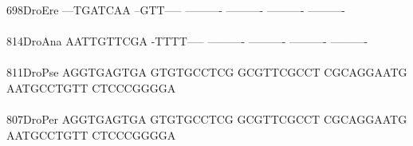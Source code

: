 \documentclass[11pt,twoside,reqno,a4paper]{article}
\begin{document}
{698\hspace*{2\charwidth}DroEre	---TGATCAA	--GTT-----	----------	----------	----------	----------	\\
\hspace*{5\charwidth}\hspace*{7\charwidth}\hspace*{1\charwidth}\hspace*{1\charwidth}\hspace*{1\charwidth}\hspace*{1\charwidth}\hspace*{1\charwidth}\hspace*{1\charwidth}\\
814\hspace*{2\charwidth}DroAna	AATTGTTCGA	-TTTT-----	----------	----------	----------	----------	\\
\hspace*{5\charwidth}\hspace*{7\charwidth}\hspace*{1\charwidth}\hspace*{1\charwidth}\hspace*{1\charwidth}\hspace*{1\charwidth}\hspace*{1\charwidth}\hspace*{1\charwidth}\\
811\hspace*{2\charwidth}DroPse	AGGTGAGTGA	GTGTGCCTCG	GCGTTCGCCT	CGCAGGAATG	AATGCCTGTT	CTCCCGGGGA	\\
\hspace*{5\charwidth}\hspace*{7\charwidth}\hspace*{1\charwidth}\hspace*{1\charwidth}\hspace*{1\charwidth}\hspace*{1\charwidth}\hspace*{1\charwidth}\hspace*{1\charwidth}\\
807\hspace*{2\charwidth}DroPer	AGGTGAGTGA	GTGTGCCTCG	GCGTTCGCCT	CGCAGGAATG	AATGCCTGTT	CTCCCGGGGA	\\
\hspace*{5\charwidth}\hspace*{7\charwidth}\hspace*{1\charwidth}\hspace*{1\charwidth}\hspace*{1\charwidth}\hspace*{1\charwidth}\hspace*{1\charwidth}\hspace*{1\charwidth}\\
}
\end{document}
